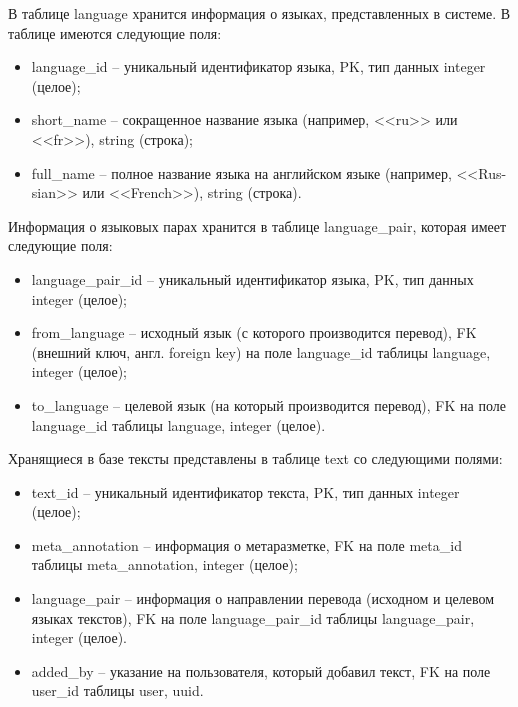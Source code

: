 В таблице language хранится информация о языках, представленных в системе. 
В таблице имеются следующие поля:

\begin{itemize}[label=---]
	\item language\_id -- уникальный идентификатор языка, PK, тип данных integer (целое);
	
	\item short\_name -- сокращенное название языка (например, <<ru>> или <<fr>>), string (строка);
	
	\item full\_name -- полное название языка на английском языке (например, <<Rus-sian>> или <<French>>), string (строка).
\end{itemize}

Информация о языковых парах хранится в таблице language\_pair, которая имеет следующие поля:

\begin{itemize}[label=---]
	\item language\_pair\_id -- уникальный идентификатор языка, PK, тип данных\\ integer (целое);
	
	\item from\_language -- исходный язык (с которого производится перевод), FK (внешний ключ, англ. foreign key) на поле language\_id таблицы language, integer (целое);
	
	\item to\_language -- целевой язык (на который производится перевод), FK на поле language\_id таблицы language, integer (целое).
\end{itemize}

Хранящиеся в базе тексты представлены в таблице text со следующими полями:

\begin{itemize}[label=---]
	\item text\_id -- уникальный идентификатор текста, PK, тип данных integer (целое);
	
	\item meta\_annotation -- информация о метаразметке, FK на поле meta\_id таблицы meta\_annotation, integer (целое);
	
	\item language\_pair -- информация о направлении перевода (исходном и целевом языках текстов), FK на поле language\_pair\_id таблицы language\_pair, integer (целое).
	
	\item added\_by -- указание на пользователя, который добавил текст, FK на поле user\_id таблицы user, uuid.
\end{itemize}

